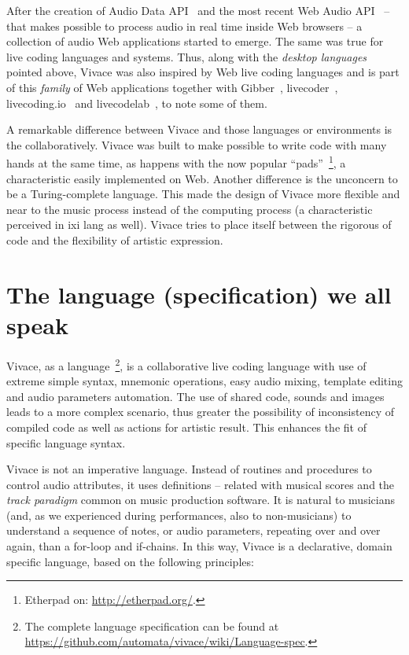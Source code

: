 \documentclass[letterpaper, 12pt]{article}
\begin{document}
After the creation of Audio Data API~\citep{audiodata} and the most
recent Web Audio API~\citep{webaudio} -- that makes possible to
process audio in real time inside Web browsers -- a collection of
audio Web applications started to emerge. The same was true for live
coding languages and systems.  Thus, along with the \textit{desktop
  languages} pointed above, Vivace was also inspired by Web live
coding languages and is part of this \textit{family} of Web
applications together with Gibber~\citep{gibber},
livecoder~\citep{livecoder}, livecoding.io~\citep{livecodingio} and
livecodelab~\citep{livecodelab}, to note some of them.

A remarkable difference between Vivace and those languages or
environments is the collaboratively. Vivace was built to make possible
to write code with many hands at the same time, as happens with the
now popular ``pads''~\footnote{Etherpad on:
  \url{http://etherpad.org/}.}, a characteristic easily implemented on
Web.  Another difference is the unconcern to be a Turing-complete
language. This made the design of Vivace more flexible and near to the
music process instead of the computing process (a characteristic
perceived in ixi lang as well). Vivace tries to place itself between
the rigorous of code and the flexibility of artistic expression.

\section{The language (specification) we all speak}

Vivace, as a language~\footnote{The complete language specification
  can be found at
  \url{https://github.com/automata/vivace/wiki/Language-spec}.}, is a
collaborative live coding language with use of extreme simple syntax,
mnemonic operations, easy audio mixing, template editing and audio
parameters automation. The use of shared code, sounds and images leads
to a more complex scenario, thus greater the possibility of
inconsistency of compiled code as well as actions for artistic
result. This enhances the fit of specific language syntax.

Vivace is not an imperative language. Instead of routines and
procedures to control audio attributes, it uses definitions -- related
with musical scores and the \emph{track paradigm} common on music
production software. It is natural to musicians (and, as we
experienced during performances, also to non-musicians) to understand
a sequence of notes, or audio parameters, repeating over and over
again, than a for-loop and if-chains. In this way, Vivace is a
declarative, domain specific language, based on the following
principles:
\end{document}
